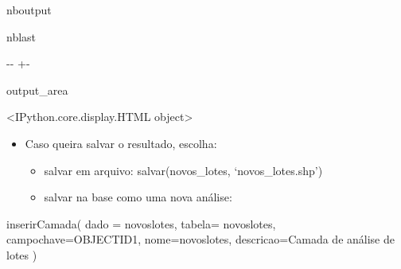 \documentclass[letterpaper,10pt,brazil]{sphinxmanual}
\newlength\nbsphinxcodecellspacing
\begin{document}
\begin{sphinxuseclass}{nboutput}
\begin{sphinxuseclass}{nblast}
{

\kern-\sphinxverbatimsmallskipamount\kern-\baselineskip
\kern+\FrameHeightAdjust\kern-\fboxrule
\vspace{\nbsphinxcodecellspacing}

\begin{sphinxuseclass}{output_area}
\begin{sphinxuseclass}{}


\begin{sphinxVerbatim}[commandchars=\\\{\}]
\llap{\color{nbsphinxout}[6]:\,\hspace{\fboxrule}\hspace{\fboxsep}}<IPython.core.display.HTML object>
\end{sphinxVerbatim}



\end{sphinxuseclass}
\end{sphinxuseclass}
}

\end{sphinxuseclass}
\end{sphinxuseclass}\begin{itemize}
\item {} 
\sphinxAtStartPar
Caso queira salvar o resultado, escolha:
\begin{itemize}
\item {} 
\sphinxAtStartPar
salvar em arquivo: salvar(novos\_lotes, ‘novos\_lotes.shp’)

\item {} 
\sphinxAtStartPar
salvar na base como uma nova análise:

\end{itemize}

\end{itemize}

\begin{sphinxVerbatim}[commandchars=\\\{\}]
inserirCamada(
    dado = novos\PYGZus{}lotes,
    tabela= novos\PYGZus{}lotes,
    \PYGZsh{}campo\PYGZus{}chave=\PYGZsq{}OBJECTID\PYGZus{}1\PYGZsq{},
    nome=\PYGZsq{}novos\PYGZus{}lotes\PYGZsq{},
    descricao=\PYGZsq{}Camada de análise de lotes\PYGZsq{}
)
\end{sphinxVerbatim}
\end{document}
